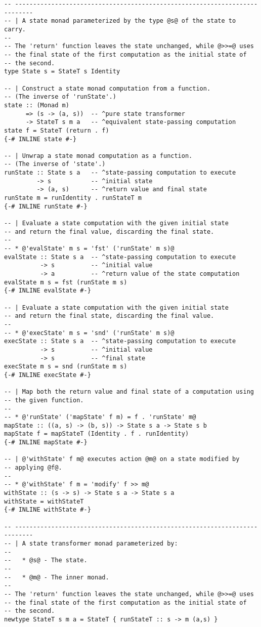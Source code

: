 \begin{multicols}{2}
\begin{lstlisting}
-- ---------------------------------------------------------------------------
-- | A state monad parameterized by the type @s@ of the state to carry.
--
-- The 'return' function leaves the state unchanged, while @>>=@ uses
-- the final state of the first computation as the initial state of
-- the second.
type State s = StateT s Identity

-- | Construct a state monad computation from a function.
-- (The inverse of 'runState'.)
state :: (Monad m)
      => (s -> (a, s))  -- ^pure state transformer
      -> StateT s m a   -- ^equivalent state-passing computation
state f = StateT (return . f)
{-# INLINE state #-}

-- | Unwrap a state monad computation as a function.
-- (The inverse of 'state'.)
runState :: State s a   -- ^state-passing computation to execute
         -> s           -- ^initial state
         -> (a, s)      -- ^return value and final state
runState m = runIdentity . runStateT m
{-# INLINE runState #-}

-- | Evaluate a state computation with the given initial state
-- and return the final value, discarding the final state.
--
-- * @'evalState' m s = 'fst' ('runState' m s)@
evalState :: State s a  -- ^state-passing computation to execute
          -> s          -- ^initial value
          -> a          -- ^return value of the state computation
evalState m s = fst (runState m s)
{-# INLINE evalState #-}

-- | Evaluate a state computation with the given initial state
-- and return the final state, discarding the final value.
--
-- * @'execState' m s = 'snd' ('runState' m s)@
execState :: State s a  -- ^state-passing computation to execute
          -> s          -- ^initial value
          -> s          -- ^final state
execState m s = snd (runState m s)
{-# INLINE execState #-}

-- | Map both the return value and final state of a computation using
-- the given function.
--
-- * @'runState' ('mapState' f m) = f . 'runState' m@
mapState :: ((a, s) -> (b, s)) -> State s a -> State s b
mapState f = mapStateT (Identity . f . runIdentity)
{-# INLINE mapState #-}

-- | @'withState' f m@ executes action @m@ on a state modified by
-- applying @f@.
--
-- * @'withState' f m = 'modify' f >> m@
withState :: (s -> s) -> State s a -> State s a
withState = withStateT
{-# INLINE withState #-}

-- ---------------------------------------------------------------------------
-- | A state transformer monad parameterized by:
--
--   * @s@ - The state.
--
--   * @m@ - The inner monad.
--
-- The 'return' function leaves the state unchanged, while @>>=@ uses
-- the final state of the first computation as the initial state of
-- the second.
newtype StateT s m a = StateT { runStateT :: s -> m (a,s) }


\end{lstlisting}
\end{multicols}
